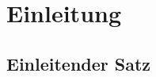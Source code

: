 \documentclass[13pt,a4paper,oneside]{scrbook} %
\newcommand{\tr}[1]{TOREMOVE-->\linebreak{#1} \linebreak <--TOREMOVE}
\begin{document}
\pagestyle{fancy}

\maketitle






\tableofcontents

\listoffigures

\listoftables



\chapter{Einleitung}

	\section{Einleitender Satz}
\end{document}
